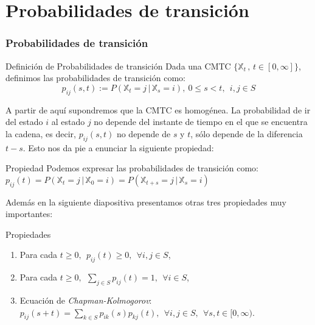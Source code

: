 \documentclass{beamer}
\begin{document}
\section{Probabilidades de transición}
\begin{frame}
    \frametitle{Probabilidades de transición}
    \begin{block}{Definición de Probabilidades de transición}
    Dada una CMTC $\{\mathbb{X}_t \, , \, t\in [0,\infty]\}$, definimos las probabilidades de transición como:
$$p_{ij}(s,t):=P(\mathbb{X}_t=j\, | \, \mathbb{X}_s=i), \ 0\leq s < t, \ \ i,j\in S$$
    \end{block}
    A partir de aquí supondremos que la CMTC es homogénea.
    \newline	\newline
     La probabilidad de ir del estado $i$ al estado $j$ no depende del instante de tiempo en el que se encuentra la cadena, es decir, $p_{ij}(s,t)$ no depende de $s$ y $t$, sólo depende de la diferencia $t-s$. Esto nos da pie a enunciar la siguiente propiedad:
  \end{frame}
  \begin{frame}
  \begin{block}{Propiedad}
  Podemos expresar las probabilidades de transición como:
 $p_{ij}(t)=P(\mathbb{X}_t=j\, | \, \mathbb{X}_0=i)=P(\mathbb{X}_{t+s}=j\, | \, \mathbb{X}_s=i)$
  \end{block}
  Además en la siguiente diapositiva presentamos otras tres propiedades muy importantes:
   \end{frame} 
   \begin{frame}
    \begin{block}{Propiedades}
\begin{enumerate}
\item Para cada $t\geq 0, \ \ p_{ij}(t)\geq 0, \ \ \forall i,j\in S$,
\item Para cada $t\geq 0, \ \ \sum\limits_{j\in S}p_{ij}(t)=1, \ \ \forall i\in S$,
\item Ecuación de \textit{Chapman-Kolmogorov}: 
$p_{ij}(s+t)=\sum\limits_{k\in S}p_{ik}(s)p_{kj}(t), \ \ \forall i,j\in S, \ \ \forall s,t\in[0,\infty)$.
\end{enumerate}
  \end{block} 
  \end{frame}
\end{document}

